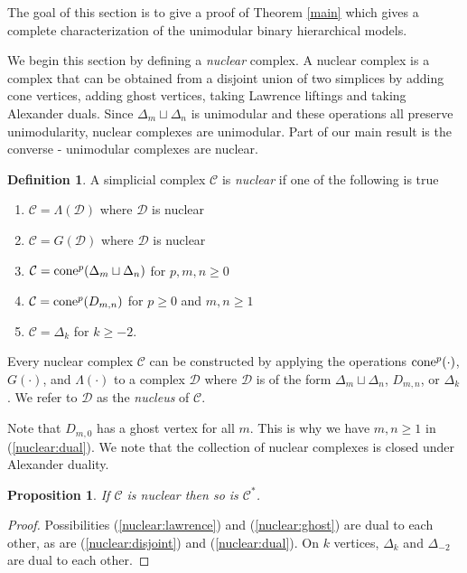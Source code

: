 \documentclass[letterpaper,12pt]{amsart}
\theoremstyle{plain}
\newtheorem{prop}[thm]{Proposition}
\theoremstyle{definition}
\newtheorem{defn}[thm]{Definition}
\theoremstyle{remark}
\newcommand{\cone}{\textnormal{cone}}
\begin{document}
The goal of this section is to give a proof of Theorem \ref{main}
which gives a complete characterization of the unimodular binary
hierarchical models.

We begin this section by defining a \emph{nuclear} complex.
A nuclear complex is a complex that can be obtained from a disjoint union
of two simplices by adding cone vertices, adding ghost vertices, taking Lawrence liftings
and taking Alexander duals.
Since $\Delta_m \sqcup \Delta_n$ is unimodular and these operations all preserve unimodularity,
nuclear complexes are unimodular.
Part of our main result is the converse - unimodular complexes are nuclear.

\begin{defn}\label{defn:nuclear}
	A simplicial complex $\mathcal{C}$ is \emph{nuclear} if one of the following is true
	\begin{enumerate}
		\item\label{nuclear:lawrence} $\mathcal{C} = \Lambda(\mathcal{D})$ where $\mathcal{D}$ is nuclear
		\item\label{nuclear:ghost} $\mathcal{C} = G(\mathcal{D})$ where $\mathcal{D}$ is nuclear
		\item\label{nuclear:disjoint} $\mathcal{C} = \cone^p(\Delta_m \sqcup \Delta_n)$ for $p,m,n \ge 0$
		\item\label{nuclear:dual} $\mathcal{C} = \cone^p(D_{m,n})$ for $p \ge 0$ and $m,n \ge 1$
		\item\label{nuclear:simplex} $\mathcal{C} = \Delta_k$ for $k \ge -2$.
	\end{enumerate}
	Every nuclear complex $\mathcal{C}$ can be constructed by applying the operations
	$\cone^p(\cdot)$, $G(\cdot)$, and $\Lambda(\cdot)$ to a complex $\mathcal{D}$
	where $\mathcal{D}$ is of the form $\Delta_m \sqcup \Delta_n$, $D_{m,n}$, or $\Delta_k$.
	We refer to $\mathcal{D}$ as the \emph{nucleus} of $\mathcal{C}$.
\end{defn}
Note that $D_{m,0}$ has a ghost vertex for all $m$.
This is why we have $m,n \ge 1$ in (\ref{nuclear:dual}).
We note that the collection of nuclear complexes is closed under Alexander duality.

\begin{prop}\label{dualclosed}
	If $\mathcal{C}$ is nuclear then so is $\mathcal{C}^*$.
\end{prop}
\begin{proof}
	Possibilities (\ref{nuclear:lawrence}) and (\ref{nuclear:ghost}) are dual to each other,
	as are (\ref{nuclear:disjoint}) and (\ref{nuclear:dual}).
	On $k$ vertices, $\Delta_k$ and $\Delta_{-2}$ are dual to each other.
\end{proof}
\end{document}
